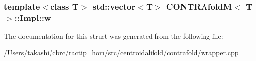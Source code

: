 \hypertarget{struct_c_o_n_t_r_afold_m_1_1_impl_a0d3688ca0a9ab1331d4976e92d2e8513}{
\subsubsection[{w\+\_\+}]{\setlength{\rightskip}{0pt plus 5cm}template$<$class T$>$ std\+::vector$<$T$>$ {\bf C\+O\+N\+T\+R\+Afold\+M}$<$ T $>$\+::Impl\+::w\+\_\+}}\label{struct_c_o_n_t_r_afold_m_1_1_impl_a0d3688ca0a9ab1331d4976e92d2e8513}


The documentation for this struct was generated from the following file\+:\begin{DoxyCompactItemize}
\item 
/\+Users/takashi/cbrc/ractip\+\_\+hom/src/centroidalifold/contrafold/\hyperlink{contrafold_2wrapper_8cpp}{wrapper.\+cpp}\end{DoxyCompactItemize}
